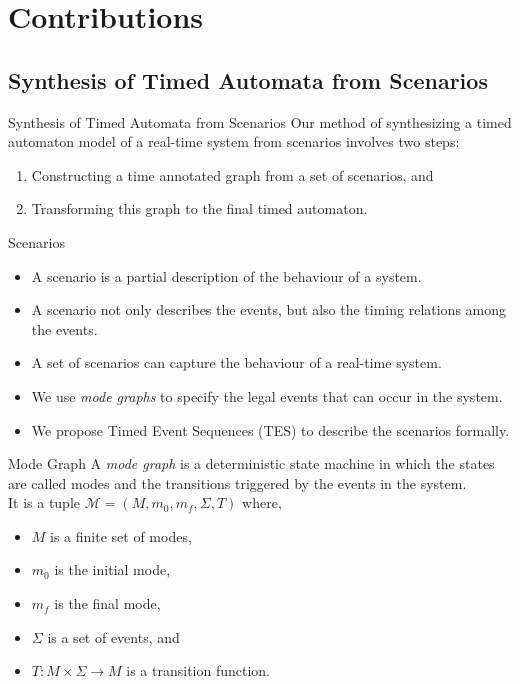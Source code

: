 \documentclass[10pt]{beamer}
\theoremstyle{plain}
\theoremstyle{definition}
\begin{document}
\section{Contributions}
\subsection{Synthesis of Timed Automata from Scenarios}

\begin{frame}{Synthesis of Timed Automata from Scenarios}
Our method of synthesizing a timed automaton model of a real-time system from scenarios involves two steps:
	\begin{enumerate}
		\item Constructing a time annotated graph from a set of scenarios, and
		\item Transforming this graph to the final timed automaton.
	\end{enumerate}
\end{frame}

\begin{frame}{%
	Scenarios}
	\begin{itemize}
		\item A scenario is a partial description of the behaviour of a system.
		\item A scenario not only describes the events, but also the timing relations among the events.
		\item A set of scenarios can capture the behaviour of a real-time system.
		
		\item We use \emph{mode graphs} to specify the legal events that can occur in the system.
		\item We propose Timed Event Sequences (TES) to describe the scenarios formally.
	\end{itemize}	
\end{frame}


\begin{frame}{Mode Graph}
A \emph{mode graph} is a deterministic state machine in which the states are called modes and the transitions triggered by the events in the system. \\
It is a tuple $\mathcal{M} = (M, m_0, m_f, \Sigma, T)$ where,
\begin{itemize}
	\item $M$ is a finite set of modes,
	\item $m_0$ is the initial mode, 
	\item $m_f$ is the final mode, 
	\item $\Sigma$ is a set of events, and 
	\item $T: M\times \Sigma \rightarrow M$ is a
	transition function.
\end{itemize}
\end{frame}
\end{document}
